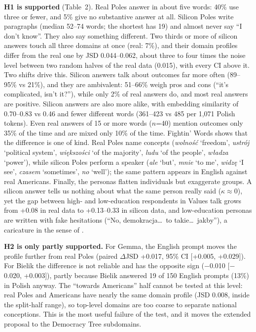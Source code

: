 \documentclass[10pt,twocolumn]{article}
\begin{document}
\textbf{H1 is supported} (Table~2). Real Poles answer in about five words: 40\% use three or fewer, and 5\% give no substantive answer at all. Silicon Poles write paragraphs (median 52--74 words; the shortest has 19) and almost never say ``I don't know''. They also say something different. Two thirds or more of silicon answers touch all three domains at once (real: 7\%), and their domain profiles differ from the real one by JSD 0.044--0.062, about three to four times the noise level between two random halves of the real data (0.015), with every CI above it. Two shifts drive this. Silicon answers talk about outcomes far more often (89--95\% vs 21\%), and they are ambivalent: 51--66\% weigh pros and cons (``it's complicated, isn't it?''), while only 2\% of real answers do, and most real answers are positive. Silicon answers are also more alike, with embedding similarity of 0.70--0.83 vs 0.46 and fewer different words (361--423 vs 485 per 1,071 Polish tokens). Even real answers of 15 or more words ($n$=40) mention outcomes only 35\% of the time and are mixed only 10\% of the time. Fightin' Words shows that the difference is one of kind. Real Poles name concepts (\emph{wolność} `freedom', \emph{ustrój} `political system', \emph{większości} `of the majority', \emph{ludu} `of the people', \emph{władza} `power'), while silicon Poles perform a speaker (\emph{ale} `but', \emph{mnie} `to me', \emph{widzę} `I see', \emph{czasem} `sometimes', \emph{no} `well'); the same pattern appears in English against real Americans. Finally, the personas flatten individuals but exaggerate groups. A silicon answer tells us nothing about what the same person really said ($\kappa\approx0$), yet the gap between high- and low-education respondents in Values talk grows from +0.08 in real data to +0.13--0.33 in silicon data, and low-education personas are written with fake hesitations (``No, demokracja\ldots\ to takie\ldots\ jakby''), a caricature in the sense of \citet{cheng2023}.

\textbf{H2 is only partly supported.} For Gemma, the English prompt moves the profile further from real Poles (paired $\Delta$JSD +0.017, 95\% CI [+0.005, +0.029]). For Bielik the difference is not reliable and has the opposite sign ($-$0.010 [$-$0.020, +0.003]), partly because Bielik answered 19 of 150 English prompts (13\%) in Polish anyway. The ``towards Americans'' half cannot be tested at this level: real Poles and Americans have nearly the same domain profile (JSD 0.008, inside the split-half range), so top-level domains are too coarse to separate national conceptions. This is the most useful failure of the test, and it moves the extended proposal to the Democracy Tree subdomains.
\end{document}

